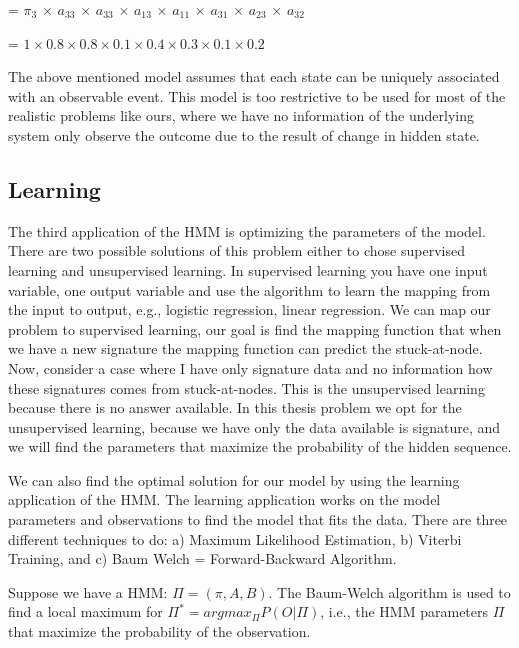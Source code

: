 \hspace{0.2cm} = $\pi_3$ $\times$ $a_33$ $\times$ $a_33$ $\times$ $a_13$ $\times$ $a_11$ $\times$ $a_31$ $\times$ $a_23$ $\times$ $a_32$

\hspace{0.2cm} = $1 \times 0.8 \times 0.8 \times 0.1 \times 0.4 \times 0.3 \times 0.1 \times 0.2$

The above mentioned model assumes that each state can be uniquely associated with an observable event. This model is too restrictive to be used for most of the realistic problems like ours, where we have no information of the underlying system only observe the outcome due to the result of change in hidden state.

\subsection{Learning}

The third application of the HMM is optimizing the parameters of the model. There are two possible solutions of this problem either to chose supervised learning and unsupervised learning.  In supervised learning you have one input variable, one output variable and use the algorithm to learn the mapping from the input to output, e.g., logistic regression, linear regression. We can map our problem to supervised learning, our goal is find the mapping function that when we have a new signature the mapping function can predict the stuck-at-node. Now, consider a case where I have only signature data and no information how these signatures comes from stuck-at-nodes.  This is the unsupervised learning because there is no answer available. In this thesis problem we opt for the unsupervised learning, because we have only the data available is signature, and we will find the parameters that maximize the probability of the hidden sequence.  

We can also find the optimal solution for our model by using the learning application of the HMM. The learning application works on the model parameters and observations to find the model that fits the data. There are three different techniques to do: a) Maximum Likelihood Estimation, b) Viterbi Training, and c) Baum  Welch = Forward-Backward Algorithm. 


Suppose we have a HMM: $\Pi = (\pi, A, B)$. The Baum-Welch algorithm is used to find  a local maximum for $\Pi^* = arg max_{\Pi} P (O | \Pi)$, i.e., the HMM parameters $\Pi$ that maximize the probability of the observation.

